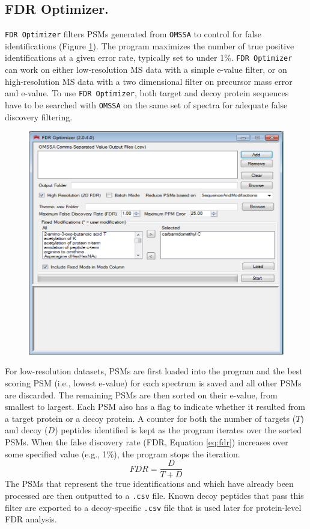 \subsection*{FDR Optimizer.}
\texttt{FDR Optimizer} filters PSMs generated from \texttt{OMSSA} to control for false identifications (Figure \ref{fig:fdr}). The program maximizes the number of true positive identifications at a given error rate, typically set to under 1\%. \texttt{FDR Optimizer} can work on either low-resolution MS data with a simple e-value filter, or on high-resolution MS data with a two dimensional filter on precursor mass error and e-value. To use \texttt{FDR Optimizer}, both target and decoy protein sequences have to be searched with \texttt{OMSSA} on the same set of spectra for adequate false discovery filtering. 
\begin{figure}[p]
	\centering
	\includegraphics[width=\columnwidth]{csmsl/fdr.png}
	\label{fig:fdr}
\end{figure}

For low-resolution datasets, PSMs are first loaded into the program and the best scoring PSM (i.e., lowest e-value) for each spectrum is saved and all other PSMs are discarded. The remaining PSMs are then sorted on their e-value, from smallest to largest. Each PSM also has a flag to indicate whether it resulted from a target protein or a decoy protein. A counter for both the number of targets ($T$) and decoy ($D$) peptides identified is kept as the program iterates over the sorted PSMs. When the false discovery rate (FDR, Equation \ref{eq:fdr}) increases over some specified value (e.g., 1\%), the program stops the iteration.
\begin{equation}
FDR =\frac{D}{T + D}
\label{eq:fdr}
\end{equation}
The PSMs that represent the true identifications and which have already been processed are then outputted to a \texttt{.csv} file. Known decoy peptides that pass this filter are exported to a decoy-specific \texttt{.csv} file that is used later for protein-level FDR analysis.

